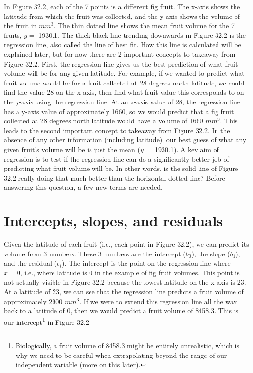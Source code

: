 \documentclass[
]{scrbook}
\begin{document}
In Figure 32.2, each of the 7 points is a different fig fruit.
The x-axis shows the latitude from which the fruit was collected, and the y-axis shows the volume of the fruit in \(mm^{3}\).
The thin dotted line shows the mean fruit volume for the 7 fruits, \(\bar{y} =\) 1930.1.
The thick black line trending downwards in Figure 32.2 is the regression line, also called the line of best fit.
How this line is calculated will be explained later, but for now there are 2 important concepts to takeaway from Figure 32.2.
First, the regression line gives us the best prediction of what fruit volume will be for any given latitude.
For example, if we wanted to predict what fruit volume would be for a fruit collected at 28 degrees north latitude, we could find the value 28 on the x-axis, then find what fruit value this corresponds to on the y-axis using the regression line.
At an x-axis value of 28, the regression line has a y-axis value of approximately 1660, so we would predict that a fig fruit collected at 28 degrees north latitude would have a volume of 1660 \(mm^{3}\).
This leads to the second important concept to takeaway from Figure 32.2.
In the absence of any other information (including latitude), our best guess of what any given fruit's volume will be is just the mean (\(\bar{y} =\) 1930.1).
A key aim of regression is to test if the regression line can do a significantly better job of predicting what fruit volume will be.
In other words, is the solid line of Figure 32.2 really doing that much better than the horizontal dotted line?
Before answering this question, a few new terms are needed.

\hypertarget{intercepts-slopes-and-residuals}{%
\section{Intercepts, slopes, and residuals}\label{intercepts-slopes-and-residuals}}

Given the latitude of each fruit (i.e., each point in Figure 32.2), we can predict its volume from 3 numbers.
These 3 numbers are the intercept (\(b_{0}\)), the slope (\(b_{1}\)), and the residual (\(\epsilon_{i}\)).
The intercept is the point on the regression line where \(x = 0\), i.e., where latitude is 0 in the example of fig fruit volumes.
This point is not actually visible in Figure 32.2 because the lowest latitude on the x-axis is 23.
At a latitude of 23, we can see that the regression line predicts a fruit volume of approximately 2900 \(mm^{3}\).
If we were to extend this regression line all the way back to a latitude of 0, then we would predict a fruit volume of 8458.3.
This is our intercept\footnote{Biologically, a fruit volume of 8458.3 might be entirely unrealistic, which is why we need to be careful when extrapolating beyond the range of our independent variable (more on this later).} in Figure 32.2.
\end{document}
